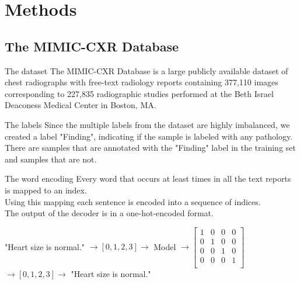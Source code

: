     \begin{frame}{}


    \end{frame}


    \section{Methods}

    \subsection{The MIMIC-CXR Database}
    \begin{frame}{The dataset}
        The MIMIC-CXR Database \cite{johnson2019mimic} is a large publicly available dataset of chest radiographs with free-text radiology reports containing 377,110 images corresponding to 227,835 radiographic studies performed at the Beth Israel Deaconess Medical Center in Boston, MA.

    \end{frame}

    \begin{frame}
    \end{frame}

    \begin{frame}{The labels}
        Since the multiple labels from the dataset are highly imbalanced, we created a label "Finding", indicating if the sample is labeled with any pathology.\\
        There are  samples that are annotated with the "Finding" label in the training set and  samples that are not.
    \end{frame}

    \begin{frame}{The word encoding}
        Every word that occurs at least  times in all the text reports is mapped to an index.\\
        Using this mapping each sentence is encoded into a sequence of indices.\\
        The output of the decoder is in a one-hot-encoded format.

        \pause
        "Heart size is normal." $\rightarrow [0,1,2,3] \rightarrow$ Model $\rightarrow
        \begin{bmatrix}
            1 & 0 & 0 & 0\\
            0 & 1 & 0 & 0\\
            0 & 0 & 1 & 0\\
            0 & 0 & 0 & 1\\
        \end{bmatrix}$\\
        $\rightarrow [0,1,2,3] \rightarrow$ "Heart size is normal."
    \end{frame}

